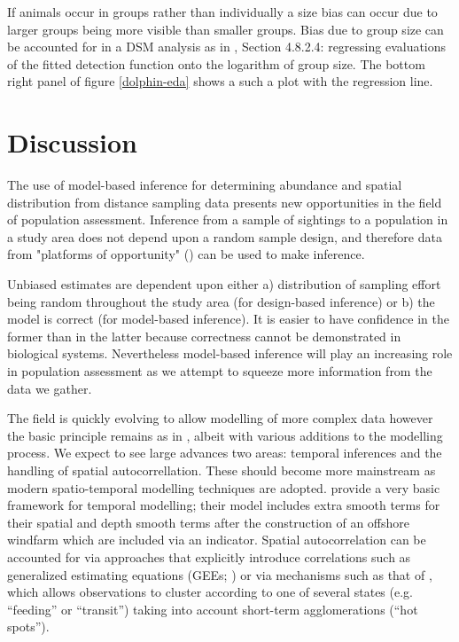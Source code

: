 \documentclass[a4paper,12pt]{article}
\begin{document}
If animals occur in groups rather than individually a size bias can occur due to larger groups being more visible than smaller groups. Bias due to group size can be accounted for in a DSM analysis as in \cite{Buckland:2001vm}, Section 4.8.2.4: regressing evaluations of the fitted detection function onto the logarithm of group size. The bottom right panel of figure \ref{dolphin-eda} shows a such a plot with the regression line.

\section*{Discussion}
\label{s:discussion}

The use of model-based inference for determining abundance and spatial distribution from distance sampling data presents new opportunities in the field of population assessment.   Inference from a sample of sightings to a population in a study area does not depend upon a random sample design, and therefore data from "platforms of opportunity" (\cite{Williams:2006tz}) can be used to make inference.

Unbiased estimates are dependent upon either a) distribution of sampling effort being random throughout the study area (for design-based inference) or b) the model is correct (for model-based inference).  It is easier to have confidence in the former than in the latter because correctness cannot be demonstrated in biological systems.  Nevertheless model-based inference will play an increasing role in population assessment as we attempt to squeeze more information from the data we gather.

The field is quickly evolving to allow modelling of more complex data however the basic principle remains as in \cite{Hedley:2004et}, albeit with various additions to the modelling process. We expect to see large advances two areas: temporal inferences and the handling of spatial autocorrellation. These should become more mainstream as modern spatio-temporal modelling techniques are adopted. \cite{Petersen:2011vy} provide a very basic framework for temporal modelling; their model includes extra smooth terms for their spatial and depth smooth terms after the construction of an offshore windfarm which are included via an indicator. Spatial autocorrelation can be accounted for via approaches that explicitly introduce correlations such as generalized estimating equations (GEEs; \cite{Hardin:2003uf}) or via mechanisms such as that of \cite{Skaug:2006gs}, which allows observations to cluster according to one of several states (e.g. ``feeding'' or ``transit'') taking into account short-term agglomerations (``hot spots'').
\end{document}
